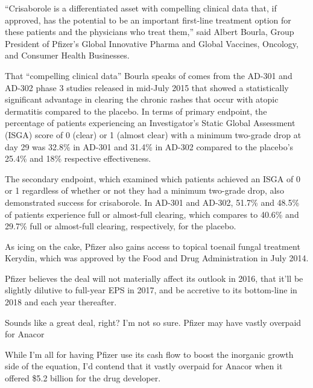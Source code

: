 \documentclass[letterpaper,12pt,english]{sphinxmanual}
\begin{document}
``Crisaborole is a differentiated asset with compelling clinical data that, if approved, has the potential to be an important first-line treatment option for these patients and the physicians who treat them,'' said Albert Bourla, Group President of Pfizer's Global Innovative Pharma and Global Vaccines, Oncology, and Consumer Health Businesses.

That ``compelling clinical data'' Bourla speaks of comes from the AD-301 and AD-302 phase 3 studies released in mid-July 2015 that showed a statistically significant advantage in clearing the chronic rashes that occur with atopic dermatitis compared to the placebo. In terms of primary endpoint, the percentage of patients experiencing an Investigator's Static Global Assessment (ISGA) score of 0 (clear) or 1 (almost clear) with a minimum two-grade drop at day 29 was 32.8\% in AD-301 and 31.4\% in AD-302 compared to the placebo's 25.4\% and 18\% respective effectiveness.

The secondary endpoint, which examined which patients achieved an ISGA of 0 or 1 regardless of whether or not they had a minimum two-grade drop, also demonstrated success for crisaborole. In AD-301 and AD-302, 51.7\% and 48.5\% of patients experience full or almost-full clearing, which compares to 40.6\% and 29.7\% full or almost-full clearing, respectively, for the placebo.

As icing on the cake, Pfizer also gains access to topical toenail fungal treatment Kerydin, which was approved by the Food and Drug Administration in July 2014.

Pfizer believes the deal will not materially affect its outlook in 2016, that it'll be slightly dilutive to full-year EPS in 2017, and be accretive to its bottom-line in 2018 and each year thereafter.

Sounds like a great deal, right? I'm not so sure.
Pfizer may have vastly overpaid for Anacor

While I'm all for having Pfizer use its cash flow to boost the inorganic growth side of the equation, I'd contend that it vastly overpaid for Anacor when it offered \$5.2 billion for the drug developer.
\begin{figure}[htbp]
\centering

\noindent{}
\end{figure}
\begin{figure}[htbp]
\centering

\noindent{}
\end{figure}
\end{document}
